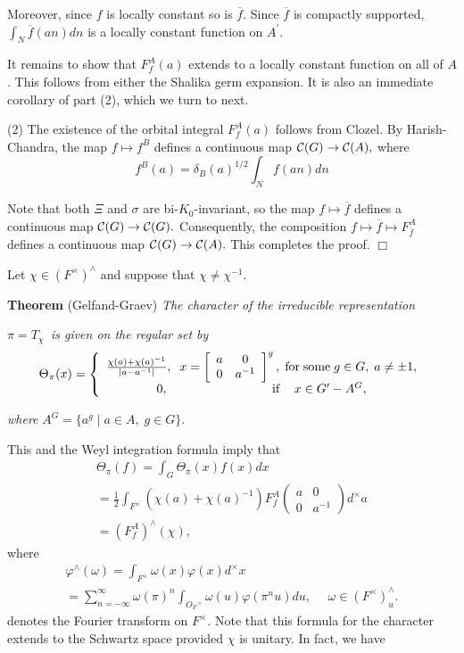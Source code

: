 Moreover, since $f$ is locally constant so is $\overline{f}$. Since $%
\overline{f}$ is compactly supported, $\int_N\overline{f}(an)dn$ is a
locally constant function on $A^{\prime }$.

It remains to show that $F_f^A(a)$ extends to a locally constant function on
all of $A$. This follows from either the Shalika germ expansion. It is also
an immediate corollary of part (2), which we turn to next.

(2) The existence of the orbital integral $F_f^A(a)$ follows from Clozel. By
Harish-Chandra, the map $f\longmapsto f^B$ defines a continuous map ${\cal C}%
(G)\rightarrow {\cal C}(A),$ where 
\[
f^B(a)=\delta _B(a)^{1/2}\int_Nf(an)dn 
\]

Note that both $\Xi $ and $\sigma $ are bi-$K_0$-invariant, so the map $%
f\longmapsto \overline{f}$ defines a continuous map ${\cal C}(G)\rightarrow 
{\cal C}(G).$ Consequently, the composition $f\longmapsto \overline{f}%
\longmapsto F_{\overline{f}}^A$ defines a continuous map ${\cal C}%
(G)\rightarrow {\cal C}(A).$ This completes the proof. $\Box $

Let $\chi \in (F^{\times })^{\wedge }$ and suppose that $\chi \neq \chi
^{-1}.$

{\bf Theorem} (Gelfand-Graev) {\em The character of the irreducible
representation }

$\pi =T_\chi ${\em \ is given on the regular set by } 
\[
\Theta _\pi (x)=\left\{ 
\begin{array}{c}
\frac{\chi (a)+\chi (a)^{-1}}{|a-a^{-1}|},\;\;x=\left[ 
\begin{array}{cc}
a & 0 \\ 
0 & a^{-1}
\end{array}
\right] ^g,\; {\rm for\;some}\;g\in G,\;a\neq \pm 1, \\ 
0,\;\;\;\;\;\;\;\;\;\;\;\;\;\;\;\;\;\;\;\;\;\;\;\;\;\;\;\;\;{\rm \;if\;}%
\;\;\;x\in G^{\prime }-A^G,
\end{array}
\right. 
\]

{\em where }$A^G=\{a^g\;|\;a\in A,\;g\in G\}.${\em \ }

This and the Weyl integration formula imply that 
\[
\begin{array}{c}
\Theta _\pi (f)=\int_G\Theta _\pi (x)f(x)dx \\ 
=\frac 12\int_{F^{\times }}(\chi (a)+\chi (a)^{-1})F_f^A( 
\begin{array}{cc}
a & 0 \\ 
0 & a^{-1}
\end{array}
)d^{\times }a \\ 
=(F_f^A)^{\wedge }(\chi ),
\end{array}
\]
where 
\[
\begin{array}{c}
\varphi ^{\wedge }(\omega )=\int_{F^{\times }}\omega (x)\varphi (x)d^{\times
}x \\ 
=\sum_{n=-\infty }^\infty \omega (\pi )^n\int_{O_F{}^{\times }}\omega
(u)\varphi (\pi ^nu)du,\ \ \ \ \ \ \omega \in (F^{\times })_u^{\wedge }.
\end{array}
\]
denotes the Fourier transform on $F^{\times }.$ Note that this formula for
the character extends to the Schwartz space provided $\chi $ is unitary. In
fact, we have

